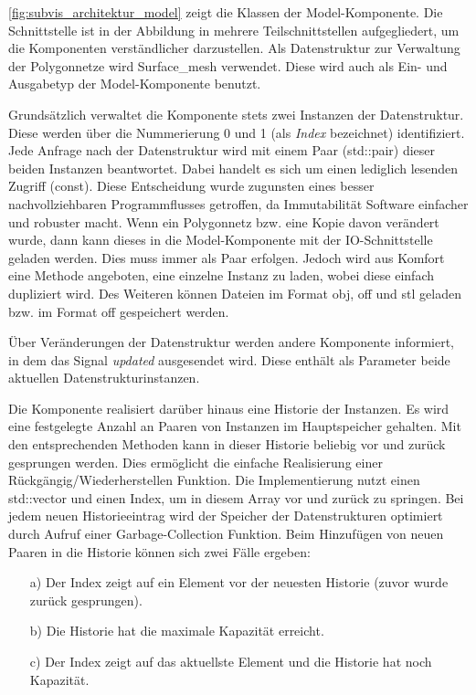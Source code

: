 \autoref{fig:subvis_architektur_model} zeigt die Klassen der Model-Komponente.
Die Schnittstelle ist in der Abbildung in mehrere Teilschnittstellen aufgegliedert, um die Komponenten verständlicher darzustellen.
Als Datenstruktur zur Verwaltung der Polygonnetze wird Surface\_mesh verwendet.
Diese wird auch als Ein- und Ausgabetyp der Model-Komponente benutzt.

Grundsätzlich verwaltet die Komponente stets zwei Instanzen der Datenstruktur.
Diese werden über die Nummerierung 0 und 1 (als \emph{Index} bezeichnet) identifiziert.
Jede Anfrage nach der Datenstruktur wird mit einem Paar (std::pair) dieser beiden Instanzen beantwortet. 
Dabei handelt es sich um einen lediglich lesenden Zugriff (const).
Diese Entscheidung wurde zugunsten eines besser nachvollziehbaren Programmflusses getroffen, da Immutabilität Software einfacher und robuster macht.
Wenn ein Polygonnetz bzw. eine Kopie davon verändert wurde, dann kann dieses in die Model-Komponente mit der IO-Schnittstelle geladen werden.
Dies muss immer als Paar erfolgen. 
Jedoch wird aus Komfort eine Methode angeboten, eine einzelne Instanz zu laden, wobei diese einfach dupliziert wird.
Des Weiteren können Dateien im Format obj, off und stl geladen bzw. im Format off gespeichert werden.

Über Veränderungen der Datenstruktur werden andere Komponente informiert, in dem das Signal \emph{updated} ausgesendet wird. 
Diese enthält als Parameter beide aktuellen Datenstrukturinstanzen.

Die Komponente realisiert darüber hinaus eine Historie der Instanzen.
Es wird eine festgelegte Anzahl an Paaren von Instanzen im Hauptspeicher gehalten.
Mit den entsprechenden Methoden kann in dieser Historie beliebig vor und zurück gesprungen werden.
Dies ermöglicht die einfache Realisierung einer Rückgängig/Wiederherstellen Funktion.
Die Implementierung nutzt einen std::vector und einen Index, um in diesem Array vor und zurück zu springen.
Bei jedem neuen Historieeintrag wird der Speicher der Datenstrukturen optimiert durch Aufruf einer Garbage-Collection Funktion.
Beim Hinzufügen von neuen Paaren in die Historie können sich zwei Fälle ergeben:

\begin{itemize}
\item[a)] Der Index zeigt auf ein Element vor der neuesten Historie (zuvor wurde zurück gesprungen).
\item[b)] Die Historie hat die maximale Kapazität erreicht.
\item[c)] Der Index zeigt auf das aktuellste Element und die Historie hat noch Kapazität.
\end{itemize}

